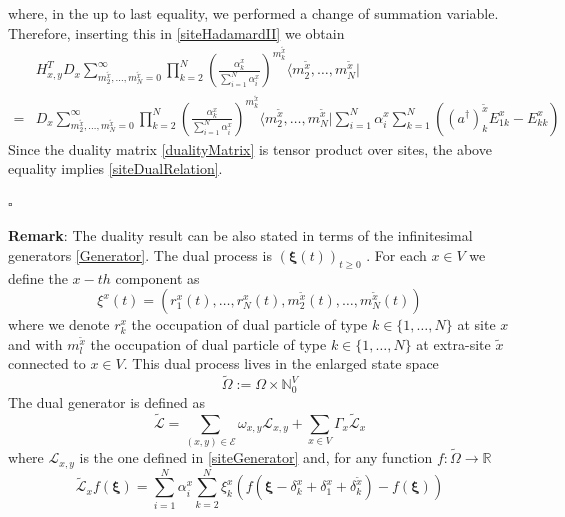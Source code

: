 \documentclass[11pt]{article}
\numberwithin{equation}{section}
\numberwithin{equation}{subsection}
\begin{document}
where, in the up to last equality, we performed a change of summation variable. Therefore, inserting this in \eqref{siteHadamardII} we obtain 
\begin{equation}
    \begin{split}
     &H_{x,y}^{T}D_{x}\sum_{m_{2}^{\widetilde{x}},\ldots,m_{N}^{\widetilde{x}}=0}^{\infty}\prod_{k=2}^{N}\left(\frac{\alpha_{k}^{x}}{\sum_{i=1}^{N}\alpha_{i}^{x}}\right)^{m_{k}^{\widetilde{x}}}\langle m_{2}^{\widetilde{x}},\ldots,m_{N}^{\widetilde{x}}|
\\=&
D_{x}\sum_{m_{2}^{\widetilde{x}},\ldots,m_{N}^{\widetilde{x}}=0}^{\infty}\prod_{k=2}^{N}\left(\frac{\alpha_{k}^{x}}{\sum_{i=1}^{N}\alpha_{i}^{x}}\right)^{m_{k}^{\widetilde{x}}}\langle m_{2}^{\widetilde{x}},\ldots,m_{N}^{\widetilde{x}}|\sum_{i=1}^{N}\alpha_{i}^{x}\sum_{k=1}^{N}\left((a^{\dagger})_{k}^{\widetilde{x}}E_{1k}^{x}-E_{kk}^{x}\right)   
    \end{split}
\end{equation}
Since the duality matrix \eqref{dualityMatrix} is tensor product over sites, the above equality implies \eqref{siteDualRelation}. 
\begin{flushright}
$\square$
\end{flushright}
\textbf{Remark}:
The duality result can be also stated  in terms of the infinitesimal generators \eqref{Generator}. The dual process is $(\bm{\xi}(t))_{t\geq 0}$ . For each $x\in V$ we define the $x-th$ component as
\begin{equation}
\xi^{x}(t)=\left(r_{1}^{x}(t),\ldots,r_{N}^{x}(t),m_{2}^{\widetilde{x}}(t),\ldots,m_{N}^{\widetilde{x}}(t)\right)
\end{equation}
 where we denote $r_{k}^{x}$ the occupation of dual particle of type $k\in \{1,\ldots,N\}$ at site $x$ and with $m_{l}^{\widetilde{x}}$ the occupation of dual particle of type $k\in \{1,\ldots,N\}$ at extra-site $\widetilde{x}$ connected to $x\in V$. This dual process lives in the enlarged state space
\begin{equation}
    \widetilde{\Omega}:=\Omega\times \mathbb{N}^{V}_{0}
\end{equation}
The dual generator is defined as
\begin{equation}
    \widetilde{\mathcal{L}}=\sum_{(x,y)\in \mathcal{E}}\omega_{x,y}\mathcal{L}_{x,y}+\sum_{x\in V}\Gamma_{x}\widetilde{\mathcal{L}}_{x}
\end{equation}
where 
$\mathcal{L}_{x,y}$ is the one defined in \eqref{siteGenerator} and, for any function $f:\widetilde{\Omega}\to \mathbb{R}$ 
\begin{equation}
    \widetilde{\mathcal{L}}_{x}f(\bm{\xi})=\sum_{i=1}^{N}\alpha_{i}^{x}\sum_{k=2}^{N}\xi_{k}^{x}\left(f(\bm{\xi}-\delta_{k}^{x}+\delta_{1}^{x}+\delta_{k}^{\widetilde{x}})-f(\bm{\xi})\right)
\end{equation}
\end{document}
